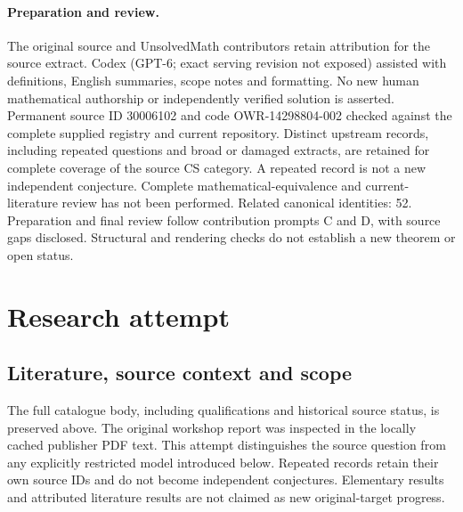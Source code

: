 \documentclass[11pt]{article}
\begin{document}
\paragraph{Preparation and review.}
The original source and UnsolvedMath contributors retain attribution for the source extract. Codex (GPT-6; exact serving revision not exposed) assisted with definitions, English summaries, scope notes and formatting. No new human mathematical authorship or independently verified solution is asserted. Permanent source ID 30006102 and code OWR-14298804-002 checked against the complete supplied registry and current repository. Distinct upstream records, including repeated questions and broad or damaged extracts, are retained for complete coverage of the source CS category. A repeated record is not a new independent conjecture. Complete mathematical-equivalence and current-literature review has not been performed. Related canonical identities: 52. Preparation and final review follow contribution prompts C and D, with source gaps disclosed. Structural and rendering checks do not establish a new theorem or open status.
\label{end:30006102}

\section{Research attempt}
\subsection{Literature, source context and scope}
The full catalogue body, including qualifications and historical source status, is preserved above. The original workshop report was inspected in the locally cached publisher PDF text. This attempt distinguishes the source question from any explicitly restricted model introduced below. Repeated records retain their own source IDs and do not become independent conjectures. Elementary results and attributed literature results are not claimed as new original-target progress.
\end{document}
